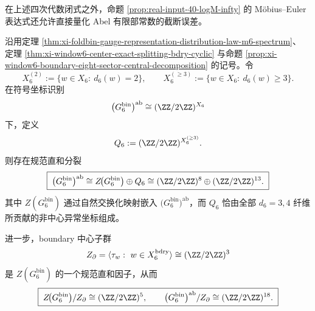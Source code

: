 \noindent 在上述四次代数闭式之外，命题 \ref{prop:real-input-40-logM-infty} 的 Möbius--Euler 表达式还允许直接量化 Abel 有限部常数的截断误差。




\begin{theorem}\label{thm:xi-window6-central-noncentral-anomaly-splitting}
沿用定理 \ref{thm:xi-foldbin-gauge-representation-distribution-law-m6-spectrum}、
定理 \ref{thm:xi-window6-center-exact-splitting-bdry-cyclic}
与命题 \ref{prop:xi-window6-boundary-eight-sector-central-decomposition} 的记号。令
\[
X_6^{(2)}:=\{w\in X_6:\ d_6(w)=2\},
\qquad
X_6^{(\ge 3)}:=\{w\in X_6:\ d_6(w)\ge 3\}.
\]
在符号坐标识别
\[
\bigl(G_6^{\mathrm{bin}}\bigr)^{\mathrm{ab}}
\cong
(\ZZ/2\ZZ)^{X_6}
\]
下，定义
\[
Q_6:= (\ZZ/2\ZZ)^{X_6^{(\ge 3)}}.
\]
则存在规范直和分裂
\[
\boxed{\;
\bigl(G_6^{\mathrm{bin}}\bigr)^{\mathrm{ab}}
\cong
Z\!\bigl(G_6^{\mathrm{bin}}\bigr)\oplus Q_6
\cong
(\ZZ/2\ZZ)^8\oplus (\ZZ/2\ZZ)^{13}.\;}
\]
其中 \(Z(G_6^{\mathrm{bin}})\) 通过自然交换化映射嵌入 \(\bigl(G_6^{\mathrm{bin}}\bigr)^{\mathrm{ab}}\)，而 \(Q_6\) 恰由全部 \(d_6=3,4\) 纤维所贡献的非中心异常坐标组成。
\par
进一步，boundary 中心子群
\[
Z_{\partial}
=
\langle \tau_w:\ w\in X_6^{\mathrm{bdry}}\rangle
\cong
(\ZZ/2\ZZ)^3
\]
是 \(Z(G_6^{\mathrm{bin}})\) 的一个规范直和因子，从而
\[
\boxed{\;
Z\!\bigl(G_6^{\mathrm{bin}}\bigr)/Z_{\partial}
\cong
(\ZZ/2\ZZ)^5,
\qquad
\bigl(G_6^{\mathrm{bin}}\bigr)^{\mathrm{ab}}/Z_{\partial}
\cong
(\ZZ/2\ZZ)^{18}.\;}
\]
\end{theorem}
